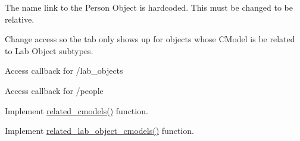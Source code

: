 
\begin{DoxyRefList}
\item[\label{todo__todo000004}%
\hypertarget{todo__todo000004}{}%
Member \hyperlink{islandora__bioinformatics__base_8module_a833d478f4f75aec1a655731d56a9524d}{islandora\+\_\+bioinformatics\+\_\+base\+\_\+form\+\_\+related\+\_\+people\+\_\+form\+\_\+alter} (\&\$form, \&\$form\+\_\+state)]The name link to the Person Object is hardcoded. This must be changed to be relative.  
\item[\label{todo__todo000001}%
\hypertarget{todo__todo000001}{}%
Member \hyperlink{islandora__bioinformatics__base_8module_a34856467f23719cd8eaf851f85ccf7e8}{islandora\+\_\+bioinformatics\+\_\+base\+\_\+menu} ()]Change access so the tab only shows up for objects whose C\+Model is be related to Lab Object subtypes. 

Access callback for /lab\+\_\+objects 

Access callback for /people  
\item[\label{todo__todo000005}%
\hypertarget{todo__todo000005}{}%
Member \hyperlink{islandora__bioinformatics__base_8module_a042f57d3aea3c501198ded2f31193f6c}{related\+\_\+cmodels} (\$objectj, \$abstract\+\_\+cmodel=None)]Implement \hyperlink{islandora__bioinformatics__base_8module_a042f57d3aea3c501198ded2f31193f6c}{related\+\_\+cmodels()} function. 
\item[\label{todo__todo000006}%
\hypertarget{todo__todo000006}{}%
Member \hyperlink{islandora__bioinformatics__base_8module_aae0f40af714fe2b8b0435eeabbb00152}{related\+\_\+lab\+\_\+object\+\_\+cmodels} (\$object)]Implement \hyperlink{islandora__bioinformatics__base_8module_aae0f40af714fe2b8b0435eeabbb00152}{related\+\_\+lab\+\_\+object\+\_\+cmodels()} function.
\end{DoxyRefList}